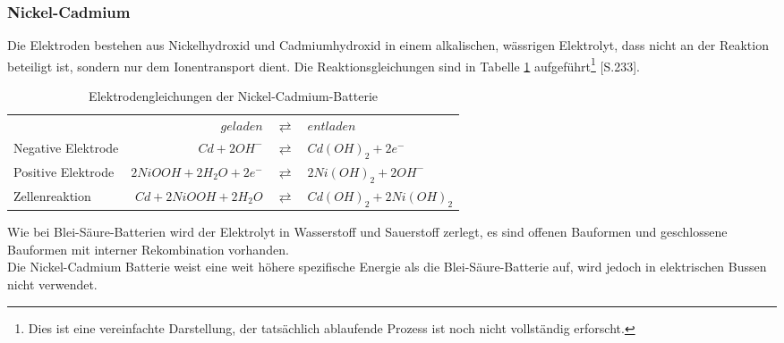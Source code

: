\subsubsection{Nickel-Cadmium} %
Die Elektroden bestehen aus Nickelhydroxid und Cadmiumhydroxid in einem alkalischen, wässrigen Elektrolyt, dass nicht an der Reaktion beteiligt ist, sondern nur dem Ionentransport dient. Die Reaktionsgleichungen sind in Tabelle \ref{NiCd} aufgeführt\footnote{Dies ist eine vereinfachte Darstellung, der tatsächlich ablaufende Prozess ist noch nicht vollständig erforscht.} \cite{Sterner:2014}[S.233].\\
\begin{table}\centering
  \begin{tabularx}{\linewidth}{XrcX}
  	                   &                       $geladen$ & $\rightleftarrows$ & $entladen$            \\
  	Negative Elektrode & $Cd + 2OH^-$ & $\rightleftarrows$ & $Cd(OH)_2 + 2e^-$       \\
  	Positive Elektrode &                  $2NiOOH + 2H_2O + 2e^-$ & $\rightleftarrows$ & $2Ni(OH)_2 + 2OH^-$ \\ \midrule
  	Zellenreaktion     &         $Cd + 2NiOOH + 2H_2O$ & $\rightleftarrows$ & $Cd(OH)_2 + 2Ni(OH)_2$
  \end{tabularx}
  \caption{Elektrodengleichungen der Nickel-Cadmium-Batterie}
  \label{NiCd}
\end{table}
Wie bei Blei-Säure-Batterien wird der Elektrolyt in Wasserstoff und Sauerstoff zerlegt, es sind offenen Bauformen und geschlossene Bauformen mit interner Rekombination vorhanden.\\
Die Nickel-Cadmium Batterie weist eine weit höhere spezifische Energie als die Blei-Säure-Batterie auf, wird jedoch in elektrischen Bussen nicht verwendet.


